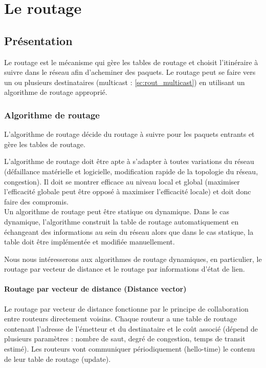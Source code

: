 \chapter{Le routage}\label{ch:routage}
 
  \section{Présentation}
Le routage est le mécanisme qui gère les tables de routage et choisit l’itinéraire à suivre dans le réseau afin d’acheminer des paquets. Le routage peut se faire vers un ou plusieurs destinataires (multicast : \ref{sc:rout_multicast}) en utilisant un algorithme de routage approprié.

  \subsection{Algorithme de routage}
L’algorithme de routage décide du routage à suivre pour les paquets entrants et gère les tables de routage. 
\medskip

L’algorithme de routage doit être apte à s’adapter à toutes variations du réseau (défaillance matérielle et logicielle, modification rapide de la topologie du réseau, congestion). Il doit se montrer efficace au niveau local et global (maximiser l’efficacité globale peut être opposé à maximiser l’efficacité locale) et doit donc faire des compromis.
\\
Un algorithme de routage peut être statique ou dynamique. 
Dans le cas dynamique, l’algorithme construit la table de routage automatiquement en échangeant des informations au sein du réseau alors que dans le cas statique, la table doit être implémentée et modifiée manuellement.
\medskip

Nous nous intéresserons aux algorithmes de routage dynamiques, en particulier, le routage par vecteur de distance et le routage par informations d’état de lien. 

  \subsubsection{Routage par vecteur de distance (Distance vector)}\label{sc:rout_vect}
Le routage par vecteur de distance fonctionne par le principe de collaboration entre routeurs directement voisins. Chaque routeur a une table de routage contenant l’adresse de l’émetteur et du destinataire et le coût associé (dépend de plusieurs paramètres : nombre de saut, degré de congestion, temps de transit estimé). Les routeurs vont communiquer périodiquement (hello-time) le contenu de leur table de routage (update).

